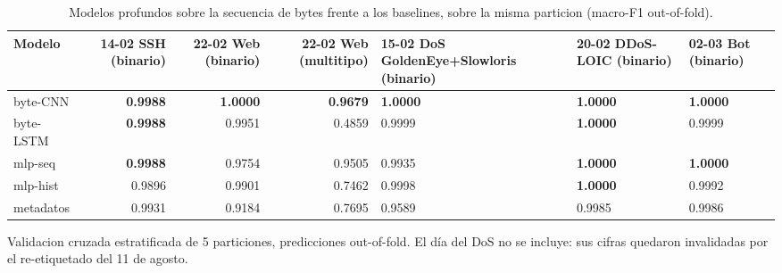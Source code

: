 \begin{table}[htbp]
  \centering
  \caption{Modelos profundos sobre la secuencia de bytes frente a los baselines, sobre la misma particion (macro-F1 out-of-fold).}
  \label{tab:dl}
  \small
  \begin{tabular}{lrrr}
    \toprule
    \textbf{Modelo} & \textbf{14-02 SSH (binario)} & \textbf{22-02 Web (binario)} & \textbf{22-02 Web (multitipo)} & \textbf{15-02 DoS GoldenEye+Slowloris (binario)} & \textbf{20-02 DDoS-LOIC (binario)} & \textbf{02-03 Bot (binario)} \\
    \midrule
    byte-CNN & \textbf{0.9988} & \textbf{1.0000} & \textbf{0.9679} & \textbf{1.0000} & \textbf{1.0000} & \textbf{1.0000} \\
    byte-LSTM & \textbf{0.9988} & 0.9951 & 0.4859 & 0.9999 & \textbf{1.0000} & 0.9999 \\
    mlp-seq & \textbf{0.9988} & 0.9754 & 0.9505 & 0.9935 & \textbf{1.0000} & \textbf{1.0000} \\
    mlp-hist & 0.9896 & 0.9901 & 0.7462 & 0.9998 & \textbf{1.0000} & 0.9992 \\
    metadatos & 0.9931 & 0.9184 & 0.7695 & 0.9589 & 0.9985 & 0.9986 \\
    \bottomrule
  \end{tabular}
  \par\smallskip\footnotesize{Validacion cruzada estratificada de 5 particiones, predicciones out-of-fold. El día del DoS no se incluye: sus cifras quedaron invalidadas por el re-etiquetado del 11 de agosto.}
\end{table}
